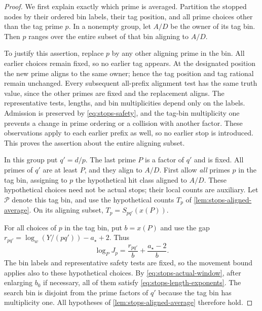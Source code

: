 \begin{proof}
We first explain exactly which prime is averaged.  Partition the stopped
nodes by their ordered bin labels, their tag position, and all prime
choices other than the tag prime $p$.  In a nonempty group, let $A/D$
be the owner of its tag bin.  Then $p$ ranges over the entire subset of
that bin aligning to $A/D$.

To justify this assertion, replace $p$ by any other aligning prime in
the bin.  All earlier choices remain fixed, so no earlier tag appears.
At the designated position the new prime aligns to the same owner;
hence the tag position and tag rational remain unchanged.  Every
subsequent all-prefix alignment test has the same truth value, since
the other primes are fixed and the replacement aligns.  The
representative tests, lengths, and bin multiplicities depend only on
the labels.  Admission is preserved by \eqref{eq:stops-safety}, and
the tag-bin multiplicity one prevents a change in prime ordering or a
collision with another factor.  These observations apply to each
earlier prefix as well, so no earlier stop is introduced.  This proves
the assertion about the entire aligning subset.

In this group put $q'=d/p$.  The last prime $P$ is a factor of $q'$
and is fixed.  All primes of $q'$ are at least $P$, and they align to
$A/D$.  First allow \emph{all} primes $p$ in the tag bin, assigning
to $p$ the hypothetical hit class aligned to $A/D$.  These hypothetical
choices need not be actual stops; their local counts are auxiliary.
Let $\mathcal P$ denote this tag bin, and use the hypothetical counts
$T_p$ of \cref{lem:stops-aligned-average}.  On its aligning subset,
$T_p=S_{pq'}(x(P))$.

For all choices of $p$ in the tag bin, put $b=x(P)$ and use the gap
$r_{pq'}=\log_w(Y/(pq'))-a_\star+2$.  Thus
\[
 \log_PJ_p=\frac{r_{pq'}}b+\frac{a_\star-2}{b}.
\]
The bin labels and representative safety tests are fixed, so the
movement bound applies also to these hypothetical choices.  By
\eqref{eq:stops-actual-window}, after enlarging $b_0$ if necessary,
all of them satisfy \eqref{eq:stops-length-exponents}.  The search
bin is disjoint from the prime factors of $q'$ because the tag bin
has multiplicity one.  All hypotheses of
\cref{lem:stops-aligned-average} therefore hold.


\end{proof}
